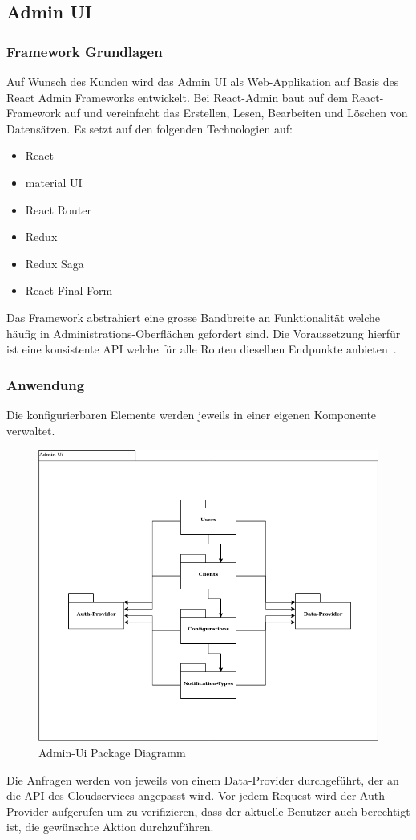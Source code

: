 \subsection{Admin UI}\label{subsec:admin-ui}

\subsubsection{Framework Grundlagen}
Auf Wunsch des Kunden wird das Admin UI als Web-Applikation auf Basis des React Admin Frameworks entwickelt.
Bei React-Admin baut auf dem React-Framework auf und vereinfacht das Erstellen, Lesen, Bearbeiten und Löschen von Datensätzen.\cite{react-admin}
Es setzt auf den folgenden Technologien auf:
\begin{itemize}
    \item React
    \item material UI
    \item React Router
    \item Redux
    \item Redux Saga
    \item React Final Form
\end{itemize}

Das Framework abstrahiert eine grosse Bandbreite an Funktionalität welche häufig in Administrations-Oberflächen gefordert sind.
Die Voraussetzung hierfür ist eine konsistente API welche für alle Routen dieselben Endpunkte anbieten~\cite{react-admin}.

\subsubsection{Anwendung}
Die konfigurierbaren Elemente werden jeweils in einer eigenen Komponente verwaltet.

\begin{figure}[h]
    \centering
    \label{fig:adminUi-packages}
    \includegraphics[width=.5\linewidth]{graphics/Admin-Ui-export}
    \caption[Admin-Ui Package Diagramm]{Admin-Ui Package Diagramm}
\end{figure}
Die Anfragen werden von jeweils von einem Data-Provider durchgeführt, der an die API des Cloudservices angepasst wird.
Vor jedem Request wird der Auth-Provider aufgerufen um zu verifizieren, dass der aktuelle Benutzer auch berechtigt ist, die gewünschte Aktion durchzuführen.

\clearpage
